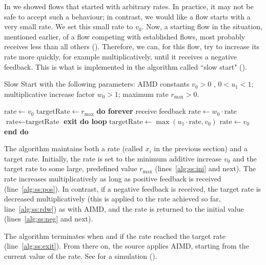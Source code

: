In  we showed flows that started with
arbitrary rates. In practice, it may not be safe to accept such
a behaviour; in contrast, we would like a flow starts with a
very small rate. We set this small rate to $v_0$. Now, a
starting flow in the situation, mentioned earlier, of a flow
competing with established flows, most probably receives less
than all others (). Therefore, we can, for
this flow, try to increase its rate more quickly, for example
multiplicatively, until it receives a negative feedback. This
is what is implemented in the algorithm called ``slow start"
().

\begin{algorithm}
\caption{Slow Start with the following parameters: AIMD constants
$v_0>0$ ,  $0<u_1<1$; multiplicative increase factor $w_0>1$;
maximum rate $r_{\max}>0$. }\label{alg:ss}
\begin{algorithmic}[1]
 \State $\mbox{rate}\gets v_0$\label{alg:ss:ini}
 \State $\mbox{targetRate}\gets r_{\max}$
 \State \textbf{do forever}
 \State receive feedback
 \State $\mbox{rate}\gets w_0 \cdot \mbox{rate}$\label{alg:ss:pos}
    \State $\mbox{rate}\gets \mbox{targetRate}$
    \State \textbf{exit do loop} \label{alg:ss:exit}
 \EndIf
 \Else
 \State $\mbox{targetRate} \gets \max(u_1 \cdot \mbox{rate}, v_0)$\label{alg:ss:rdw}
 \State $\mbox{rate}\gets v_0 $\label{alg:ss:neg}
 \EndIf
 \State \textbf{end do}
\end{algorithmic}
\end{algorithm}

The algorithm maintains both a rate (called $x_i$ in the
previous section) and a target rate. Initially, the rate is set
to the minimum additive increase $v_0$ and the target rate to
some large, predefined value $r_{\max}$ (lines~\ref{alg:ss:ini} and next).
The rate increases multiplicatively as long as positive
feedback is received (line~\ref{alg:ss:pos}). In contrast, if a
negative feedback is received, the target rate is decreased
multiplicatively (this is applied to the rate achieved so far,
line~\ref{alg:ss:rdw}) as with AIMD, and the rate is returned
to the initial value (lines~\ref{alg:ss:neg} and next).

The algorithm terminates when and if the rate reached the target
rate (line~\ref{alg:ss:exit}). From there on, the source applies
AIMD, starting from the current value of the rate. See 
for a simulation ().

